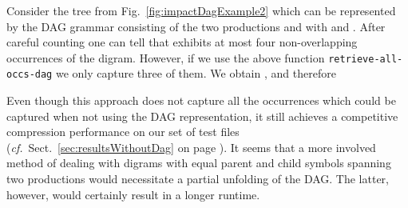 \documentclass[12pt]{llncs}
\newcommand{\tp}{digram\xspace}
\newcommand{\tps}{digrams\xspace}
\newcommand{\cf}{\textit{cf.}~}
\begin{document}
\begin{example}
Consider the tree  from
Fig.~\ref{fig:impactDagExample2} which can be represented by the DAG
grammar consisting of the two productions  and  with  and . After
careful counting one can tell that  exhibits at most four
non-overlapping occurrences of the \tp . However, if
we use the above function \verb|retrieve-all-occs-dag| we only capture
three of them. We obtain 
,  and therefore

\end{example}
Even though this approach does not capture all the occurrences which could be captured when not using the DAG representation, it still achieves a competitive compression performance on our set of test files (\cf Sect.~\ref{sec:resultsWithoutDag} on page \pageref{sec:resultsWithoutDag}). It seems that a more involved method of dealing with \tps with equal parent and child symbols spanning two productions would necessitate a partial unfolding of the DAG. The latter, however, would certainly result in a longer runtime.
\end{document}
